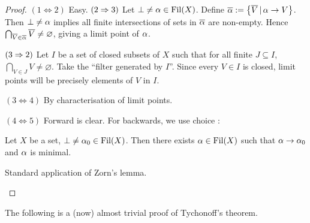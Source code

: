 \documentclass[main.tex]{subfiles}
\begin{document}
\begin{proof}

  $(1 \iff 2)$ Easy. $(2 \Rightarrow 3)$ 
  Let $\bot \neq \alpha \in \operatorname{Fil}(X)$.
  Define $\overline{\alpha} := \left\{\overline{V}\,|\, \alpha \to V\right\}$.
  Then $\bot \neq \alpha$ implies 
  all finite intersections of sets in $\overline{\alpha}$ are non-empty. 
  Hence $\bigcap_{\overline{V} \in \overline{\alpha}} \overline{V} \neq \varnothing$,
  giving a limit point of $\alpha$.

  $(3\Rightarrow 2)$ Let $I$ be a set of closed subsets of $X$
  such that for all finite $J \subseteq I$, 
  $\bigcap_{V \in J} V \neq \varnothing$.
  Take the ``filter generated by $I$''.
  Since every $V \in I$ is closed, 
  limit points will be precisely elements of $V$ in $I$.

  $(3 \iff 4)$ By characterisation of limit points.

  $(4 \iff 5)$ 
  Forward is clear. For backwards, we use choice :  
  \begin{lem} 
  
    Let $X$ be a set, $\bot \neq \alpha_0 \in \operatorname{Fil}(X)$.
    Then there exists $\alpha \in \operatorname{Fil}(X)$ such that 
    $\alpha \to \alpha_0$ and $\alpha$ is minimal.
    \begin{proof1}
      Standard application of Zorn's lemma.
    \end{proof1}
  \end{lem}
\end{proof}

\begin{rmk}
  The following is a (now) almost trivial proof 
  of Tychonoff's theorem.
\end{rmk}
\end{document}
